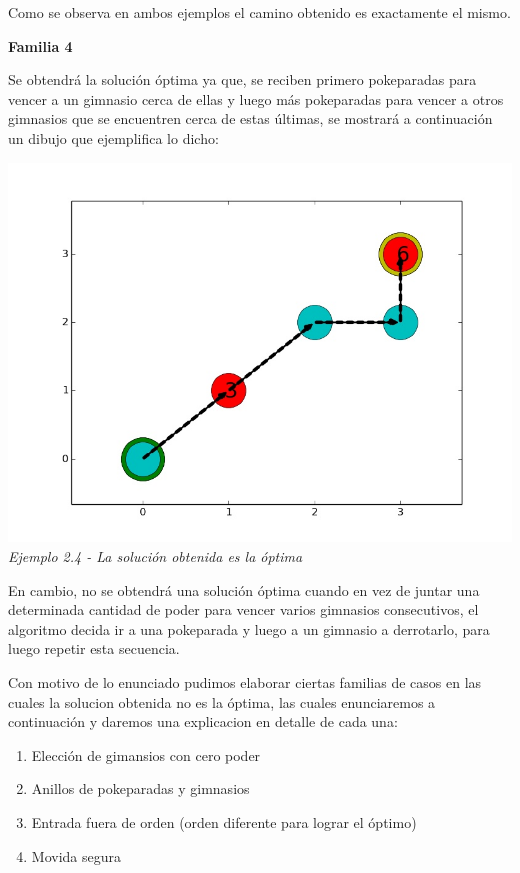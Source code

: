 Como se observa en ambos ejemplos el camino obtenido es exactamente el mismo.


\begin{center}
\textbf{Familia 4}
\end{center}

Se obtendr\'a la soluci\'on \'optima ya que, se reciben primero pokeparadas para vencer a un gimnasio cerca de ellas y luego m\'as pokeparadas para vencer a otros gimnasios que se encuentren cerca de estas \'ultimas, se mostrar\'a a continuaci\'on un dibujo que ejemplifica lo dicho:

\vspace*{0.3cm} \vspace*{0.3cm}
  \begin{center}
\includegraphics[scale=0.60]{./EJ2/optima.jpeg}
\\{\textit{Ejemplo 2.4 - La soluci\'on obtenida es la \'optima}}
  \end{center}
  \vspace*{0.3cm}

En cambio, no se obtendr\'a una soluci\'on \'optima cuando en vez de juntar una determinada cantidad de poder para vencer varios gimnasios consecutivos, el algoritmo decida ir a una pokeparada y luego a un gimnasio a derrotarlo, para luego repetir esta secuencia.

Con motivo de lo enunciado pudimos elaborar ciertas familias de casos en las cuales la solucion obtenida no es la \'optima, las cuales enunciaremos a continuaci\'on y daremos una explicacion en detalle de cada una:

\begin{enumerate}
\item Elección de gimansios con cero poder 
\item Anillos de pokeparadas y gimnasios
\item Entrada fuera de orden (orden diferente para lograr el óptimo)
\item Movida segura
\end{enumerate}


